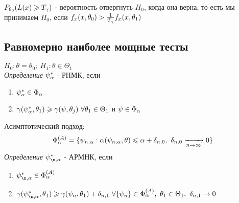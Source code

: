 $P_{\theta_0}(L(x) \geqslant T_{\gamma})$ - вероятность отвергнуть $H_0$, когда она верна, то есть мы принимаем $H_0$, если $f_x(x, \theta_0) > \frac{1}{T_{\gamma}}f_x(x, \theta_1)$

\subsection{Равномерно наиболее мощные тесты}

$H_0 : \theta = \theta_0;~H_1 : \theta \in \Theta_1$ \\
\textit{Определение} $\psi_{\alpha}^{*}$ - РНМК, если
\begin{enumerate}
  \item $\psi_{\alpha}^{*} \in \Phi_{\alpha}$
  \item $\gamma(\psi_{\alpha}^{*}, \theta_1) \geqslant \gamma(\psi, \theta_j)~\forall \theta_1 \in \Theta_1$ и $\psi \in \Phi_{\alpha}$
\end{enumerate}

Асимптотический подход: \\
\[
  \Phi_{\alpha}^{(A)} = \{ \psi_{n, \alpha} : \alpha(\psi_{n, \alpha}, \theta) \leqslant \alpha + \delta_{n, 0},~\delta_{n, 0} \xrightarrow[n \to \infty]{} 0 \}
\]
\textit{Определение} $\psi_{\n, \a}^{*}$ - АРМНК, если
\begin{enumerate}
  \item $\psi_{\n, \a}^{*} \in \Phi_{\a}^{(A)}$
  \item $\g(\psi_{\n, \a}^{*}, \theta_1) \geqslant \g(\psi_n, \theta_1) + \delta_{n, 1}~\forall\{\psi_n\} \in \Phi_{\a}^{(A)},~\theta_1 \in \Theta_1,~ \delta_{n, 1} \xrightarrow[]{} 0$
\end{enumerate}

